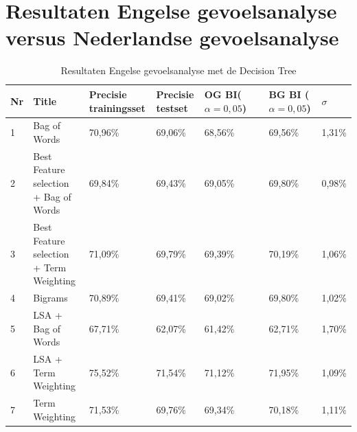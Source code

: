 \chapter{Resultaten Engelse gevoelsanalyse versus Nederlandse gevoelsanalyse}\label{bijlage vs}

\begin{table}
\centering
\caption{Resultaten Engelse gevoelsanalyse met de Decision Tree}
\begin{adjustbox}{width=1\textwidth}
\begin{tabular}{|l|l|l|l|l|l|l|}
\hline
{\bf Nr} & {\bf Title}                                                                      & {\bf Precisie trainingsset} & {\bf Precisie testset} & {\bf OG BI($\alpha=0,05$)} & {\bf BG BI ($\alpha=0,05$)} & {\bf $\sigma$} \\ \hline
1        & Bag of Words                                                                     & 70,96\%                     & 69,06\%                & 68,56\%                 & 69,56\%                  & 1,31\%      \\ \hline
2        & Best Feature selection + Bag of Words                                            & 69,84\%                     & 69,43\%                & 69,05\%                 & 69,80\%                  & 0,98\%      \\ \hline
3        & Best Feature selection + Term Weighting                                          & 71,09\%                     & 69,79\%                & 69,39\%                 & 70,19\%                  & 1,06\%      \\ \hline
4        & Bigrams                                                                          & 70,89\%                     & 69,41\%                & 69,02\%                 & 69,80\%                  & 1,02\%      \\ \hline
5        & LSA + Bag of Words                                                               & 67,71\%                     & 62,07\%                & 61,42\%                 & 62,71\%                  & 1,70\%      \\ \hline
6        & LSA + Term Weighting                                                             & 75,52\%                     & 71,54\%                & 71,12\%                 & 71,95\%                  & 1,09\%      \\ \hline
7        & Term Weighting                                                                   & 71,53\%                     & 69,76\%                & 69,34\%                 & 70,18\%                  & 1,11\%      \\ \hline

\end{tabular}
\end{adjustbox}
\end{table}
